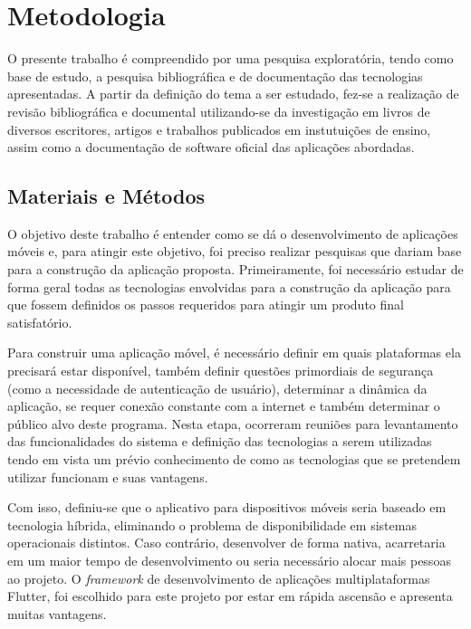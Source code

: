 



\chapter{Metodologia}\label{cap:metodologia}

O presente trabalho é compreendido por uma pesquisa exploratória, tendo como base de estudo, a pesquisa bibliográfica e de documentação das tecnologias apresentadas. A partir da definição do tema a ser estudado, fez-se a realização de revisão bibliográfica e documental utilizando-se da investigação em livros de diversos escritores, artigos e trabalhos publicados em instutuições de ensino, assim como a documentação de software oficial das aplicações abordadas.

\section{Materiais e Métodos}

O objetivo deste trabalho é entender como se dá o desenvolvimento de aplicações móveis e, para atingir este objetivo, foi preciso realizar pesquisas que dariam base para a construção da aplicação proposta. Primeiramente, foi necessário estudar de forma geral todas as tecnologias envolvidas para a construção da aplicação para que fossem definidos os passos requeridos para atingir um produto final satisfatório. 

Para construir uma aplicação móvel, é necessário definir em quais plataformas ela precisará estar disponível, também definir questões primordiais de segurança (como a necessidade de autenticação de usuário), determinar a dinâmica da aplicação, se requer conexão constante com a internet e também determinar o público alvo deste programa. Nesta etapa, ocorreram reuniões para levantamento das funcionalidades do sistema e definição das tecnologias a serem utilizadas tendo em vista um prévio conhecimento de como as tecnologias que se pretendem utilizar funcionam e suas vantagens.

Com isso, definiu-se que o aplicativo para dispositivos móveis seria baseado em tecnologia híbrida, eliminando o problema de disponibilidade em sistemas operacionais distintos. Caso contrário, desenvolver de forma nativa, acarretaria em um maior tempo de desenvolvimento ou seria necessário alocar mais pessoas ao projeto. O \textit{framework} de desenvolvimento de aplicações multiplataformas Flutter, foi escolhido para este projeto por estar em rápida ascensão e apresenta muitas vantagens. 


